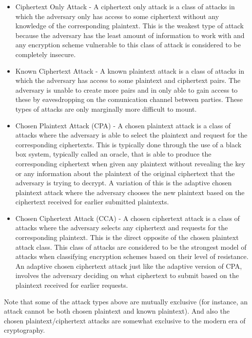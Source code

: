 \begin{itemize}
	\item Ciphertext Only Attack \cite{Menezes1996} - A ciphertext only attack is a class of attacks in which the adversary only has access to some ciphertext without any knowledge of the corresponding plaintext. This is the weakest type of attack because the adversary has the least amount of information to work with and any encryption scheme vulnerable to this class of attack is considered to be completely insecure.
	
	\item Known Ciphertext Attack \cite{Menezes1996} - A known plaintext attack is a class of attacks in which the adversary has access to some plaintext and ciphertext pairs. The  adversary is unable to create more pairs and in only able to gain access to these by eavesdropping on the comunication channel between parties. These types of attacks are only marginally more difficult to mount. 
	
	\item Chosen Plaintext Attack (CPA) \cite{Menezes1996} - A chosen plaintext attack is a class of attacks where the adversary is able to select the plaintext and request for the corresponding ciphertexts. This is typically done through the use of a black box system, typically called an oracle, that is able to produce the corresponding ciphertext when given any plaintext without revealing the key or any information about the plaintext of the original ciphertext that the adversary is trying to decrypt. A variation of this is the adaptive chosen plaintext attack where the adversary chooses the new plaintext based on the ciphertext received for earlier submitted plaintexts.
	
	\item Chosen Ciphertext Attack (CCA) \cite{Menezes1996} - A chosen ciphertext attack is a class of attacks where the adversary selects any ciphertext and requests for the corresponding plaintext. This is the direct opposite of the chosen plaintext attack class. This class of attacks are considered to be the strongest model of attacks when classifying encryption schemes based on their level of resistance. An adaptive chosen ciphertext attack just like the adaptive version of CPA, involves the adversary deciding on what ciphertext to submit based on the plaintext received for earlier requests.
	
\end{itemize}

Note that some of the attack types above are mutually exclusive (for instance, an attack cannot be both chosen plaintext and known plaintext). And also the chosen plaintext/ciphertext attacks are somewhat exclusive to the modern era of cryptography.

